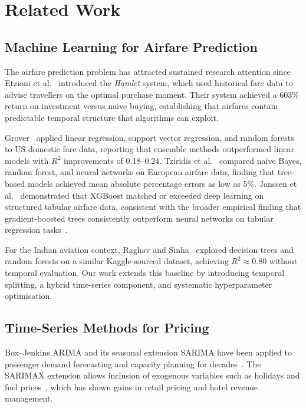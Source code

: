 \documentclass[12pt, a4paper]{article}
\begin{document}
\section{Related Work}
\label{sec:related}

\subsection{Machine Learning for Airfare Prediction}

The airfare prediction problem has attracted sustained research attention since
Etzioni et al.~\cite{etzioni2003} introduced the \textit{Hamlet} system, which
used historical fare data to advise travellers on the optimal purchase moment.
Their system achieved a 603\% return on investment versus naive buying, establishing
that airfares contain predictable temporal structure that algorithms can exploit.

Grover~\cite{grover2015} applied linear regression, support vector regression,
and random forests to US domestic fare data, reporting that ensemble methods
outperformed linear models with $R^2$ improvements of 0.18--0.24.  Tziridis
et al.~\cite{tziridis2017} compared na\"{i}ve Bayes, random forest, and neural
networks on European airfare data, finding that tree-based models achieved mean
absolute percentage errors as low as 5\%.  Janssen et al.~\cite{janssen2019}
demonstrated that XGBoost matched or exceeded deep learning on structured
tabular airfare data, consistent with the broader empirical finding that
gradient-boosted trees consistently outperform neural networks on tabular
regression tasks~\cite{grinsztajn2022}.

For the Indian aviation context, Raghav and Sinha~\cite{raghav2020} explored
decision trees and random forests on a similar Kaggle-sourced dataset, achieving
$R^2 \approx 0.80$ without temporal evaluation.  Our work extends this baseline
by introducing temporal splitting, a hybrid time-series component, and systematic
hyperparameter optimisation.

\subsection{Time-Series Methods for Pricing}

Box--Jenkins ARIMA and its seasonal extension SARIMA have been applied to
passenger demand forecasting and capacity planning for decades~\cite{grubb2001,
shumway2017, box2015}.  The SARIMAX extension allows inclusion of exogenous
variables such as holidays and fuel prices~\cite{box2015}, which has shown
gains in retail pricing and hotel revenue management.
\end{document}
